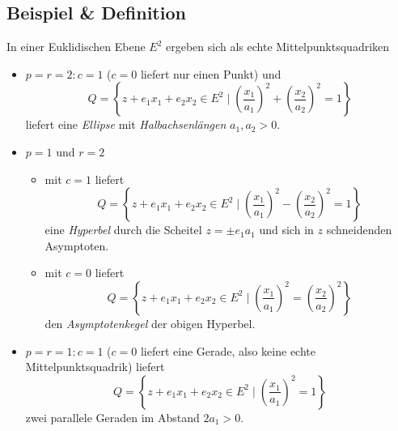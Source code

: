 \subsection{Beispiel \& Definition}
	In einer Euklidischen Ebene $ E^2 $ ergeben sich als echte Mittelpunktsquadriken
		\begin{itemize}
			\item $ p=r=2 : c=1 $ ($ c=0 $ liefert nur einen Punkt) und
				\[ Q=\left\{z+e_1x_1+e_2x_2\in E^2\mid \left(\frac{x_1}{a_1}\right)^2+\left(\frac{x_2}{a_2}\right)^2 = 1\right\} \]
				liefert eine \emph{Ellipse} mit \emph{Halbachsenlängen} $ a_1,a_2 > 0$.
			\item $ p=1 $ und $ r=2 $
				\begin{itemize}
					\item mit $ c=1 $ liefert
						\[ Q=\left\{z+e_1x_1+e_2x_2\in E^2\mid \left(\frac{x_1}{a_1}\right)^2-\left(\frac{x_2}{a_2}\right)^2 = 1\right\} \]
						eine \emph{Hyperbel} durch die Scheitel $ z=\pm e_1a_1 $ und sich in $ z $ schneidenden Asymptoten.
					\item mit $ c=0 $ liefert
						\[ Q=\left\{z+e_1x_1+e_2x_2\in E^2\mid \left(\frac{x_1}{a_1}\right)^2=\left(\frac{x_2}{a_2}\right)^2 \right\} \]
						den \emph{Asymptotenkegel} der obigen Hyperbel.
				\end{itemize}
			\item $ p=r=1 : c=1 $ ($ c=0 $ liefert eine Gerade, also keine echte Mittelpunktsquadrik) liefert
				\[ Q=\left\{z+e_1x_1+e_2x_2\in E^2\mid \left(\frac{x_1}{a_1}\right)^2 = 1\right\} \]
			zwei parallele Geraden im Abstand $ 2a_1 > 0$.
		\end{itemize}
	